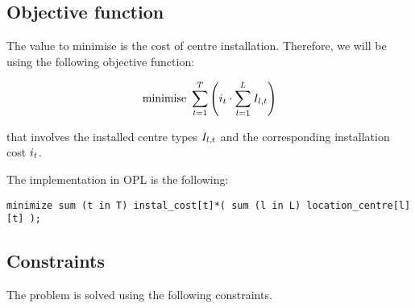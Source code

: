 \subsection{Objective function}
\label{sec:ILP-form:obj-func}

The value to minimise is the cost of centre installation. Therefore, we will be using the
following objective function:

\begin{equation}
\text{minimise }
\sum_{t = 1}^{T}
    \left(
        i_t \cdot 
        \sum_{l = 1}^{L} I_{l, t}
    \right)
\label{ILP:objective-function}
\end{equation}

that involves the installed centre types $I_{l, t}$ and the corresponding installation
cost $i_t$.

\hfill

The implementation in OPL is the following:

\begin{lstlisting}
minimize sum (t in T) instal_cost[t]*( sum (l in L) location_centre[l][t] );
\end{lstlisting}

\subsection{Constraints}
\label{sec:ILP-form:constraints}

The problem is solved using the following constraints.

